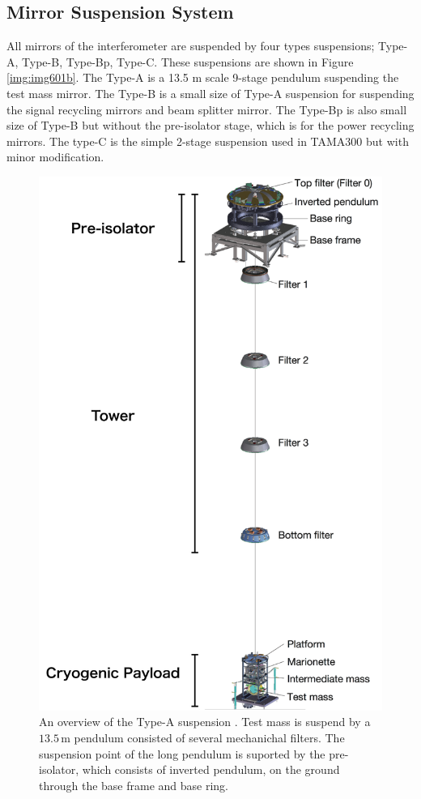 \subsection{Mirror Suspension System}
All mirrors of the interferometer are suspended by four types suspensions; Type-A, Type-B, Type-Bp, Type-C. These suspensions are shown in Figure \ref{img:img601b}. The Type-A is a 13.5 m scale 9-stage pendulum suspending the test mass mirror. The Type-B is a small size of Type-A suspension for suspending the signal recycling mirrors and beam splitter mirror. The Type-Bp is also small size of Type-B but without the pre-isolator stage, which is for the power recycling mirrors. The type-C is the simple 2-stage suspension used in TAMA300 but with minor modification.
\begin{figure}[p]
  \begin{center}   
    \includegraphics[width=13cm]{./img_chap6/img604.png}
    \caption{An overview of the Type-A suspension \cite{Okutomi2019development}. Test mass is suspend by a $13.5\,\mathrm{m}$ pendulum consisted of several mechanichal filters. The suspension point of the long pendulum is suported by the pre-isolator, which consists of inverted pendulum, on the ground through the base frame and base ring.}\label{img:img604}
  \end{center}
\end{figure}

